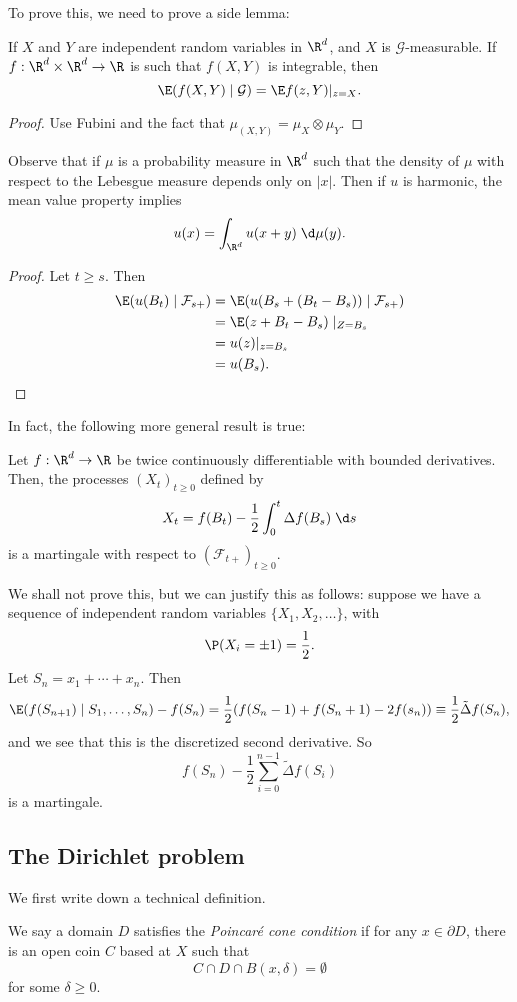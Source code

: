 \documentclass[a4paper]{article}
\begin{document}
To prove this, we need to prove a side lemma:
\begin{lemma}
  If $X$ and $Y$ are independent random variables in $\R^d$, and $X$ is $\mathcal{G}$-measurable. If $f: \R^d \times \R^d \to \R$ is such that $f(X, Y)$ is integrable, then
  \[
    \E(f(X, Y) \mid \mathcal{G}) = \E f(z, Y)|_{z = X}.
  \]
\end{lemma}

\begin{proof}
  Use Fubini and the fact that $\mu_{(X, Y)} = \mu_X \otimes \mu_Y$.
\end{proof}

Observe that if $\mu$ is a probability measure in $\R^d$ such that the density of $\mu$ with respect to the Lebesgue measure depends only on $|x|$. Then if $u$ is harmonic, the mean value property implies
\[
  u(x) = \int_{\R^d} u(x + y) \;\d \mu(y).
\]
\begin{proof}
  Let $t \geq s$. Then
  \begin{align*}
    \E (u (B_t) \mid \mathcal{F}_{s+}) &= \E(u(B_s + (B_t - B_s)) \mid \mathcal{F}_{s+})\\
    &= \E(z + B_t - B_s) \mid _{Z = B_s}\\
    &= u(z)|_{z = B_s}\\
    &= u(B_s).
  \end{align*}
\end{proof}

In fact, the following more general result is true:
\begin{thm}
  Let $f: \R^d \to \R$ be twice continuously differentiable with bounded derivatives. Then, the processes $(X_t)_{t \geq 0}$ defined by
  \[
    X_t = f(B_t) - \frac{1}{2} \int_0^t \Delta f(B_s)\;\d s
  \]
  is a martingale with respect to $(\mathcal{F}_{t+})_{t \geq 0}$.
\end{thm}
We shall not prove this, but we can justify this as follows: suppose we have a sequence of independent random variables $\{X_1, X_2, \ldots\}$, with
\[
  \P(X_i = \pm 1) = \frac{1}{2}.
\]
Let $S_n = x_1 + \cdots + x_n$. Then
\[
  \E(f(S_{n + 1}) \mid S_1, \ldots, S_n) - f(S_n) = \frac{1}{2} (f(S_n - 1) + f(S_n + 1) - 2 f(s_n)) \equiv \frac{1}{2} \tilde{\Delta} f(S_n),
\]
and we see that this is the discretized second derivative. So
\[
  f(S_n) - \frac{1}{2} \sum_{i = 0}^{n - 1} \tilde{\Delta} f(S_i)
\]
is a martingale.

\subsection{The Dirichlet problem}
We first write down a technical definition.
\begin{defi}
  We say a domain $D$ satisfies the \emph{Poincar\'e cone condition} if for any $x \in \partial D$, there is an open coin $C$ based at $X$ such that
  \[
    C \cap D \cap B(x, \delta) = \emptyset
  \]
  for some $\delta \geq 0$.
\end{defi}
\end{document}
